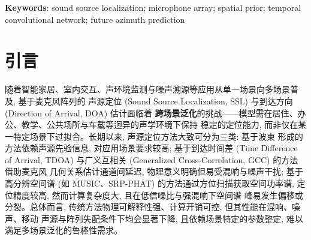 \documentclass[UTF8,a4paper,11pt]{ctexart}
\begin{document}
\begin{abstract}
\textbf{Objective}: Existing sound source localization (SSL) methods estimate only the current-frame
azimuth and leave short-horizon future azimuth prediction unaddressed. This paper studies a unified
model for current localization and short-horizon future azimuth prediction in an 8-channel uniform
circular array speech scenario. \textbf{Method}: A multi-task TrackTrend network is proposed that
takes log-mel, IPD and SRP-PHAT as explicit spatial-prior front-ends, fuses them with three encoders
and a causal TCN, and jointly outputs the current azimuth heatmap and the future $K{=}32$ frames
($320\,\mathrm{ms}$) of azimuth, count and activity. On RealMAN with the same ring1+center 9-channel
array as the official CRNN baseline, leak-free train/val splits are constructed and compared with
linear-extrapolation and Kalman baselines.
\textbf{Results}: (1) The proposed model reaches $82.8\%$ ACC@5 on current-frame localization,
approaching the official CRNN's $83.9\%$, while also enabling short-horizon future azimuth prediction
that the official baselines lack. (2) On future azimuth prediction, the model achieves $74.8\%$ ACC@5,
significantly outperforming linear extrapolation ($64.7\%$) and Kalman ($37.4\%$).
\textbf{Conclusion}: Complementary fusion of explicit spatial priors
is necessary for real-array localization, and end-to-end future prediction captures non-linear
source dynamics beyond the constant-velocity assumption.
\end{abstract}

\noindent\textbf{Keywords}: sound source localization; microphone array; spatial prior;
temporal convolutional network; future azimuth prediction

\section{引言}

随着智能家居、室内交互、声环境监测与噪声溯源等应用从单一场景向多场景普及, 基于麦克风阵列的
声源定位 (Sound Source Localization, SSL) 与到达方向 (Direction of Arrival, DOA) 估计面临着
\textbf{跨场景泛化}的挑战——模型需在居住、办公、教学、公共场所与车载等迥异的声学环境下保持
稳定的定位能力, 而非仅在某一特定场景下过拟合。长期以来, 声源定位方法大致可分为三类: 基于波束
形成的方法依赖声源先验信息, 对应用场景要求较高; 基于到达时间差 (Time Difference of Arrival,
TDOA) 与广义互相关 (Generalized Cross-Correlation, GCC) 的方法 \cite{knapp1976gcc} 借助麦克风
几何关系估计通道间延迟, 物理意义明确但易受混响与噪声干扰; 基于高分辨空间谱 (如 MUSIC、SRP-PHAT)
的方法通过方位扫描获取空间功率谱, 定位精度较高, 然而计算复杂度大, 且在低信噪比与强混响下空间谱
峰易发生偏移或分裂。总体而言, 传统方法物理可解释性强、计算开销可控, 但其性能在混响、噪声、移动
声源与阵列失配条件下均会显著下降, 且依赖场景特定的参数整定, 难以满足多场景泛化的鲁棒性需求。
\end{document}

